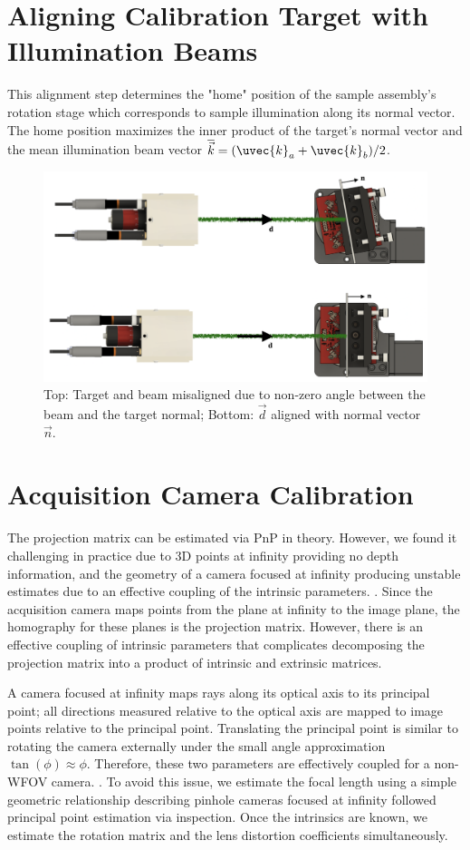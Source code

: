 \section{Aligning Calibration Target with Illumination Beams}
This alignment step determines the "home" position of the sample assembly's rotation stage which corresponds to sample illumination along its normal vector. The home position maximizes the inner product of the target's normal vector and the mean illumination beam vector $\overline{\vec{k}} = (\uvec{k}_a + \uvec{k}_b)/2$.
\begin{figure}
    \centering
    \includegraphics[width=0.5\linewidth]{figures/target_alignment.png}
    \caption{Top: Target and beam misaligned due to non-zero angle between the beam and the target normal; Bottom: $\vec{d}$ aligned with normal vector $\vec{n}$. }
    \label{fig:sample_beam_alignment}
\end{figure}

\section{Acquisition Camera Calibration}
The projection matrix can be estimated via PnP in theory. However, we found it challenging in practice due to 3D points at infinity providing no depth information, and the geometry of a camera focused at infinity producing unstable estimates due to an effective coupling of the intrinsic parameters. . Since the acquisition camera maps points from the plane at infinity to the image plane, the homography for these planes is the projection matrix. However, there is an effective coupling of intrinsic parameters that complicates decomposing the projection matrix into a product of intrinsic and extrinsic matrices. 

A camera focused at infinity maps rays along its optical axis to its principal point; all directions measured relative to the optical axis are mapped to image points relative to the principal point. Translating the principal point is similar to rotating the camera externally under the small angle approximation $\tan(\phi) \approx \phi$. Therefore, these two parameters are effectively coupled for a non-WFOV camera. . To avoid this issue, we estimate the focal length using a simple geometric relationship describing pinhole cameras focused at infinity followed principal point estimation via inspection. Once the intrinsics are known, we estimate the rotation matrix and the lens distortion coefficients simultaneously.

